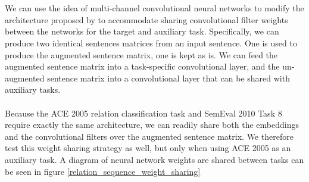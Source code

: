 \\\\
We can use the idea of multi-channel convolutional neural networks to modify the architecture proposed by \citet{nguyen2015} to accommodate sharing convolutional filter weights between the networks for the target and auxiliary task. Specifically, we can produce two identical sentences matrices from an input sentence. One is used to produce the augmented sentence matrix, one is kept as is. We can feed the augmented sentence matrix into a task-specific convolutional layer, and the un-augmented sentence matrix into a convolutional layer that can be shared with auxiliary tasks.
\\\\
Because the ACE 2005 relation classification task and SemEval 2010 Task 8 require exactly the same architecture, we can readily share both the embeddings and the convolutional filters over the augmented sentence matrix. We therefore test this weight sharing strategy as well, but only when using ACE 2005 as an auxiliary task. A diagram of neural network weights are shared between tasks can be seen in figure \ref{relation_sequence_weight_sharing}
\newpage
